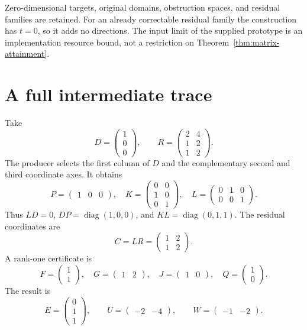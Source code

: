Zero-dimensional targets, original domains, obstruction spaces, and residual families are retained. For an already correctable residual family the construction has $t=0$, so it adds no directions. The input limit of the supplied prototype is an implementation resource bound, not a restriction on Theorem~\ref{thm:matrix-attainment}.

\section{A full intermediate trace}\label{sec:matrix-worked}
Take
\[
 D=\begin{pmatrix}1\\0\\0\end{pmatrix},\qquad
 R=\begin{pmatrix}2&4\\1&2\\1&2\end{pmatrix}.
\]
The producer selects the first column of $D$ and the complementary second and third coordinate axes. It obtains
\[
 P=\begin{pmatrix}1&0&0\end{pmatrix},\quad
 K=\begin{pmatrix}0&0\\1&0\\0&1\end{pmatrix},\quad
 L=\begin{pmatrix}0&1&0\\0&0&1\end{pmatrix}.
\]
Thus $LD=0$, $DP=\operatorname{diag}(1,0,0)$, and $KL=\operatorname{diag}(0,1,1)$. The residual coordinates are
\[
 C=LR=\begin{pmatrix}1&2\\1&2\end{pmatrix}.
\]
A rank-one certificate is
\[
 F=\begin{pmatrix}1\\1\end{pmatrix},\quad
 G=\begin{pmatrix}1&2\end{pmatrix},\quad
 J=\begin{pmatrix}1&0\end{pmatrix},\quad
 Q=\begin{pmatrix}1\\0\end{pmatrix}.
\]
The result is
\[
 E=\begin{pmatrix}0\\1\\1\end{pmatrix},\qquad
 U=\begin{pmatrix}-2&-4\end{pmatrix},\qquad
 W=\begin{pmatrix}-1&-2\end{pmatrix}.
\]
